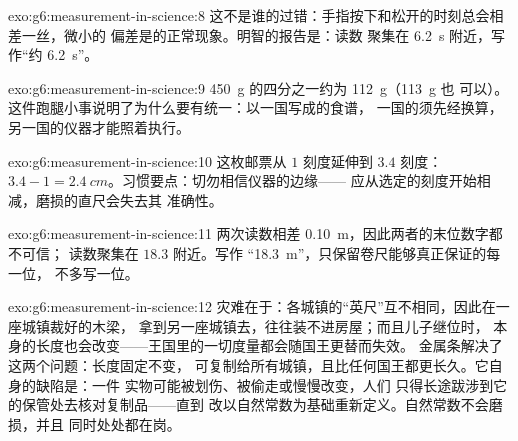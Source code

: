 \begin{solution}{exo:g6:measurement-in-science:8}
这不是谁的过错：手指按下和松开的时刻总会相差一丝，微小的
偏差是的正常现象。明智的报告是：读数
聚集在 \qty{6.2}{s} 附近，写作“约 \qty{6.2}{s}”。
\end{solution}

\begin{solution}{exo:g6:measurement-in-science:9}
\qty{450}{g} 的四分之一约为 \qty{112}{g}（\qty{113}{g} 也
可以）。这件跑腿小事说明了为什么要有统一：以一国写成的食谱，
一国的须先经换算，
另一国的仪器才能照着执行。
\end{solution}

\begin{solution}{exo:g6:measurement-in-science:10}
这枚邮票从 $1$ 刻度延伸到 $3.4$ 刻度：$3.4 - 1 =
\qty{2.4}{cm}$。习惯要点：切勿相信仪器的边缘——
应从选定的刻度开始相减，磨损的直尺会失去其
准确性。
\end{solution}

\begin{solution}{exo:g6:measurement-in-science:11}
两次读数相差 \qty{0.10}{m}，因此两者的末位数字都不可信；
读数聚集在 $18.3$ 附近。写作
“\qty{18.3}{m}”，只保留卷尺能够真正保证的每一位，
不多写一位。
\end{solution}

\begin{solution}{exo:g6:measurement-in-science:12}
灾难在于：各城镇的“英尺”互不相同，因此在一座城镇裁好的木梁，
拿到另一座城镇去，往往装不进房屋；而且儿子继位时，
本身的长度也会改变——王国里的一切度量都会随国王更替而失效。
金属条解决了这两个问题：长度固定不变，
可复制给所有城镇，且比任何国王都更长久。它自身的缺陷是：一件
实物可能被划伤、被偷走或慢慢改变，人们
只得长途跋涉到它的保管处去核对复制品——直到
改以自然常数为基础重新定义。自然常数不会磨损，并且
同时处处都在岗。
\end{solution}

